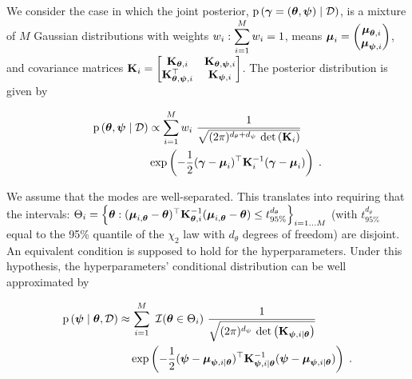\smallskip
We consider the case in which the joint posterior, $\mathrm{p} \left( \boldsymbol{\gamma}=(\boldsymbol{\theta},\boldsymbol{\psi}) \mid \mathcal{D} \right)$, is a mixture of $M$ Gaussian distributions with weights $w_i : \displaystyle \sum_{i=1}^{M} w_i =1$, means $\boldsymbol{\mu}_i = \begin{pmatrix} \boldsymbol{\mu}_{\boldsymbol{\theta},i} \\ \boldsymbol{\mu}_{\boldsymbol{\psi},i} \end{pmatrix}$, and covariance matrices $\mathbf{K}_i = \begin{bmatrix}
    \mathbf{K}_{\boldsymbol{\theta},i} & \mathbf{K}_{\boldsymbol{\theta},\boldsymbol{\psi},i} \\
    \mathbf{K}_{\boldsymbol{\theta},\boldsymbol{\psi},i}^{\top} & \mathbf{K}_{\boldsymbol{\psi},i}
\end{bmatrix}$. The posterior distribution is given by

\begin{equation}
    \left.
        \begin{aligned}
            \mathrm{p} \left( \boldsymbol{\theta}, \boldsymbol{\psi} \mid \mathcal{D} \right) &\propto \sum_{i=1}^{M} w_i \ \dfrac{1}{\sqrt{(2\pi)^{d_\theta + d_\psi} \ \mathrm{det}\left(\mathbf{K}_i\right)}} \\
            & \exp\left( -\dfrac{1}{2}(\boldsymbol{\gamma}-\boldsymbol{\mu}_i)^{\top} \mathbf{K}_i^{-1} (\boldsymbol{\gamma}-\boldsymbol{\mu}_i)\right) \;.
        \end{aligned}
        \right.
    \label{eq:mix_gauss}
\end{equation}

We assume that the modes are well-separated. This translates into requiring that the intervals: $\Theta_i = \left\{ \boldsymbol{\theta} : (\boldsymbol{\mu}_{i, \boldsymbol{\theta}} - \boldsymbol{\theta})^{\top} \mathbf{K}_{\boldsymbol{\theta},i}^{-1} (\boldsymbol{\mu}_{i, \boldsymbol{\theta}} - \boldsymbol{\theta})  \leq t_{95\%}^{d_\theta} \right\}_{i=1\ldots M}$ (with $t_{95\%}^{d_\theta}$ equal to the 95\% quantile of the $\chi_2$ law with $d_{\theta}$ degrees of freedom) are disjoint. An equivalent condition is supposed to hold for the hyperparameters. Under this hypothesis, the hyperparameters' conditional distribution can be well approximated by

\begin{equation}
    \left.
        \begin{aligned}
    \mathrm{p} \left( \boldsymbol{\psi} \mid \boldsymbol{\theta}, \mathcal{D} \right) \approx & \, \displaystyle \sum_{i=1}^{M} \ \mathcal{I}(\boldsymbol{\theta} \in \Theta_i) \ \dfrac{1}{\sqrt{(2\pi)^{d_\psi} \ \mathrm{det}\left(\mathbf{K}_{\boldsymbol{\psi},i \mid \boldsymbol{\theta}}\right)}} \\
    &\exp\left( -\dfrac{1}{2}(\boldsymbol{\psi}-\boldsymbol{\mu}_{\boldsymbol{\psi},i \mid \boldsymbol{\theta}})^{\top} \mathbf{K}_{\boldsymbol{\psi},i \mid \boldsymbol{\theta}}^{-1} (\boldsymbol{\psi}-\boldsymbol{\mu}_{\boldsymbol{\psi},i \mid \boldsymbol{\theta}})\right) \;.
        \end{aligned}
    \right.
    \label{eq:hp_mix_gauss}
\end{equation}

